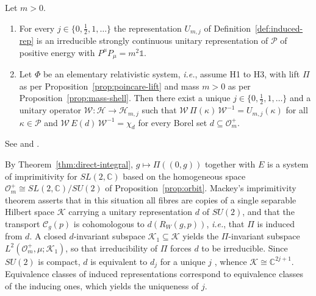 \begin{theorem}\label{thm:wigner-mackey}
	Let $m>0$.
	\begin{enumerate}
		\item For every $j\in\{0,\tfrac12,1,\dots\}$ the representation $U_{m,j}$ of Definition~\ref{def:induced-rep} is an irreducible strongly continuous unitary representation of $\mathcal{P}$ of positive energy with $P^\mu P_\mu=m^2\mathbb{1}$.
		\item Let $\Phi$ be an elementary relativistic system, \textit{i.e.}, assume H1 to H3, with lift $\Pi$ as per Proposition~\ref{prop:poincare-lift} and mass $m>0$ as per Proposition~\ref{prop:mass-shell}. Then there exist a unique $j\in\{0,\tfrac12,1,\dots\}$ and a unitary operator $\mathcal{W}:\mathcal{H}\to\mathcal{H}_{m,j}$ such that $\mathcal{W}\,\Pi(\kappa)\,\mathcal{W}^{-1}=U_{m,j}(\kappa)$ for all $\kappa\in\mathcal{P}$ and $\mathcal{W}\,E(d)\,\mathcal{W}^{-1}=\chi_d$ for every Borel set $d\subseteq\mathcal{O}_m^+$.
	\end{enumerate}
\end{theorem}

\noindent See \cite[TODO-location]{TODO-Wigner1939} and \cite[TODO-location]{TODO-Mackey1958}.

\begin{remark}\label{rem:mackey-idea}
	By Theorem~\ref{thm:direct-integral}, $g\mapsto\Pi((0,g))$ together with $E$ is a system of imprimitivity for $SL(2,\mathbb{C})$ based on the homogeneous space $\mathcal{O}_m^+\cong SL(2,\mathbb{C})/SU(2)$ of Proposition~\ref{prop:orbit}. Mackey's imprimitivity theorem asserts that in this situation all fibres are copies of a single separable Hilbert space $\mathcal{K}$ carrying a unitary representation $d$ of $SU(2)$, and that the transport $\mathcal{C}_g(p)$ is cohomologous to $d(R_W(g,p))$, \textit{i.e.}, that $\Pi$ is induced from $d$. A closed $d$-invariant subspace $\mathcal{K}_1\subseteq\mathcal{K}$ yields the $\Pi$-invariant subspace $L^2(\mathcal{O}_m^+,\mu;\mathcal{K}_1)$, so that irreducibility of $\Pi$ forces $d$ to be irreducible. Since $SU(2)$ is compact, $d$ is equivalent to $d_j$ for a unique $j$ \cite[TODO-location]{TODO-Hal03}, whence $\mathcal{K}\cong\mathbb{C}^{2j+1}$. Equivalence classes of induced representations correspond to equivalence classes of the inducing ones, which yields the uniqueness of $j$.
\end{remark}

